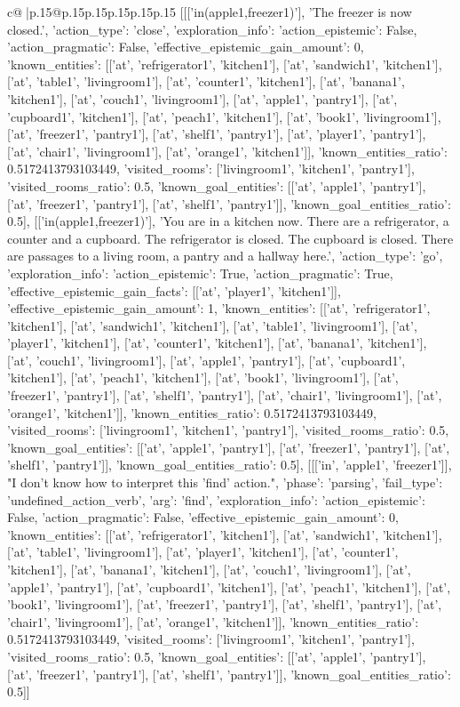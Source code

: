\documentclass{article}
\begin{document}
{\begin{supertabular}{c@{$\;$}|p{.15\linewidth}@{}p{.15\linewidth}p{.15\linewidth}p{.15\linewidth}p{.15\linewidth}p{.15\linewidth}}
{{{	 [[['in(apple1,freezer1)'], 'The freezer is now closed.', {'action_type': 'close', 'exploration_info': {'action_epistemic': False, 'action_pragmatic': False, 'effective_epistemic_gain_amount': 0, 'known_entities': [['at', 'refrigerator1', 'kitchen1'], ['at', 'sandwich1', 'kitchen1'], ['at', 'table1', 'livingroom1'], ['at', 'counter1', 'kitchen1'], ['at', 'banana1', 'kitchen1'], ['at', 'couch1', 'livingroom1'], ['at', 'apple1', 'pantry1'], ['at', 'cupboard1', 'kitchen1'], ['at', 'peach1', 'kitchen1'], ['at', 'book1', 'livingroom1'], ['at', 'freezer1', 'pantry1'], ['at', 'shelf1', 'pantry1'], ['at', 'player1', 'pantry1'], ['at', 'chair1', 'livingroom1'], ['at', 'orange1', 'kitchen1']], 'known_entities_ratio': 0.5172413793103449, 'visited_rooms': ['livingroom1', 'kitchen1', 'pantry1'], 'visited_rooms_ratio': 0.5, 'known_goal_entities': [['at', 'apple1', 'pantry1'], ['at', 'freezer1', 'pantry1'], ['at', 'shelf1', 'pantry1']], 'known_goal_entities_ratio': 0.5}}], [['in(apple1,freezer1)'], 'You are in a kitchen now. There are a refrigerator, a counter and a cupboard. The refrigerator is closed. The cupboard is closed. There are passages to a living room, a pantry and a hallway here.', {'action_type': 'go', 'exploration_info': {'action_epistemic': True, 'action_pragmatic': True, 'effective_epistemic_gain_facts': [['at', 'player1', 'kitchen1']], 'effective_epistemic_gain_amount': 1, 'known_entities': [['at', 'refrigerator1', 'kitchen1'], ['at', 'sandwich1', 'kitchen1'], ['at', 'table1', 'livingroom1'], ['at', 'player1', 'kitchen1'], ['at', 'counter1', 'kitchen1'], ['at', 'banana1', 'kitchen1'], ['at', 'couch1', 'livingroom1'], ['at', 'apple1', 'pantry1'], ['at', 'cupboard1', 'kitchen1'], ['at', 'peach1', 'kitchen1'], ['at', 'book1', 'livingroom1'], ['at', 'freezer1', 'pantry1'], ['at', 'shelf1', 'pantry1'], ['at', 'chair1', 'livingroom1'], ['at', 'orange1', 'kitchen1']], 'known_entities_ratio': 0.5172413793103449, 'visited_rooms': ['livingroom1', 'kitchen1', 'pantry1'], 'visited_rooms_ratio': 0.5, 'known_goal_entities': [['at', 'apple1', 'pantry1'], ['at', 'freezer1', 'pantry1'], ['at', 'shelf1', 'pantry1']], 'known_goal_entities_ratio': 0.5}}], [[['in', 'apple1', 'freezer1']], "I don't know how to interpret this 'find' action.", {'phase': 'parsing', 'fail_type': 'undefined_action_verb', 'arg': 'find', 'exploration_info': {'action_epistemic': False, 'action_pragmatic': False, 'effective_epistemic_gain_amount': 0, 'known_entities': [['at', 'refrigerator1', 'kitchen1'], ['at', 'sandwich1', 'kitchen1'], ['at', 'table1', 'livingroom1'], ['at', 'player1', 'kitchen1'], ['at', 'counter1', 'kitchen1'], ['at', 'banana1', 'kitchen1'], ['at', 'couch1', 'livingroom1'], ['at', 'apple1', 'pantry1'], ['at', 'cupboard1', 'kitchen1'], ['at', 'peach1', 'kitchen1'], ['at', 'book1', 'livingroom1'], ['at', 'freezer1', 'pantry1'], ['at', 'shelf1', 'pantry1'], ['at', 'chair1', 'livingroom1'], ['at', 'orange1', 'kitchen1']], 'known_entities_ratio': 0.5172413793103449, 'visited_rooms': ['livingroom1', 'kitchen1', 'pantry1'], 'visited_rooms_ratio': 0.5, 'known_goal_entities': [['at', 'apple1', 'pantry1'], ['at', 'freezer1', 'pantry1'], ['at', 'shelf1', 'pantry1']], 'known_goal_entities_ratio': 0.5}}]] 
}}}
\end{supertabular}}
\end{document}
